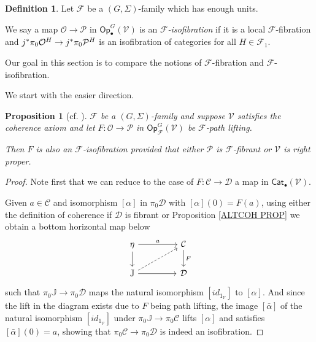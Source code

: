 \documentclass[a4paper,10pt
,draft
]{article}%
\numberwithin{equation}{section}
\numberwithin{figure}{section}
\newtheorem{proposition}[equation]{Proposition}%
\theoremstyle{definition} %
\newtheorem{definition}[equation]{Definition}%
\newcommand{\Op}{\mathsf{Op}}%
\newcommand{\F}{\ensuremath{\mathcal F}}
\newcommand{\V}{\ensuremath{\mathcal V}}
\renewcommand{\O}{\ensuremath{\mathcal O}}
\renewcommand{\P}{\ensuremath{\mathcal P}}
\newcommand{\1}{\ensuremath{\mathbbm 1}}%
\begin{document}
\begin{definition}
	Let $\F$ be a $(G,\Sigma)$-family which has enough units.
	
	We say a map $\O \to \P$ in $\Op_\bullet^G(\V)$ is an \textit{$\F$-isofibration} if
	it is a local $\F$-fibration and
	$j^{\**}\pi_0 \O^H \to j^{\**}\pi_0\P^H$
	is an isofibration of categories for all $H \in \F_1$.
\end{definition}


Our goal in this section is to compare the 
notions of $\F$-fibration and $\F$-isofibration.

We start with the easier direction.


\begin{proposition}[{cf. \cite[Props. 2.3]{Ber07b}}]
	\label{ISOFIBEASY PROP}
	$\F$ be a $(G,\Sigma)$-family and 
	suppose $\V$ satisfies the coherence axiom
	and let 
	$F: \O \to \P$ in $\Op^G_\F(\V)$
	be $\F$-path lifting.
	
	Then $F$ is also an $\F$-isofibration
	provided that either $\mathcal{P}$ is $\F$-fibrant
	or $\V$ is right proper.
\end{proposition}


\begin{proof}
	Note first that we can reduce to 
	the case of $F \colon \mathcal{C} \to \mathcal{D}$
	a map in $\mathsf{Cat}_{\bullet} (\V)$.

	Given $a \in \mathcal{C}$
	and isomorphism $[\alpha]$ in $\pi_0 \mathcal{D}$
	with $[\alpha](0)=F(a)$,
	using either the definition of coherence 
	if $\mathcal{D}$ is fibrant or 
	Proposition \ref{ALTCOH PROP}
	we obtain a bottom horizontal map below 
\begin{equation}
	\begin{tikzcd}[column sep = 45pt]
	\eta \ar{d} \ar{r}{a}
&
	\mathcal{C} \ar{d}{F}
	\\
	\mathbb{J} \ar{r} \ar[dashed]{ru}
&
	\mathcal{D}
	\end{tikzcd}
\end{equation}
	such that $\pi_0 \mathbb{J} \to \pi_0\mathcal{D}$
	maps the natural isomorphism $[id_{1_{\V}}]$ to $[\alpha]$.
	And since the lift in the diagram exists due to $F$ being path lifting,
	the image $[\bar{\alpha}]$
	of the natural isomorphism $[id_{1_{\V}}]$
	under $\pi_0 \mathbb{J} \to \pi_0\mathcal{C}$
	lifts $[\alpha]$
	and satisfies $[\bar{\alpha}](0) = a$,
	showing that
	$\pi_0 \mathcal{C} \to \pi_0 \mathcal{D}$
	is indeed an isofibration.
\end{proof}
\end{document}
